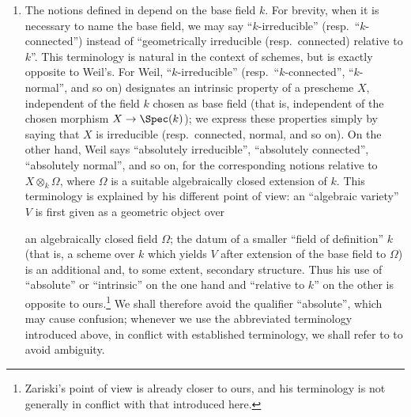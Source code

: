 \begin{remarks}[4.5.12]
\label{IV.4.5.12}
\begin{enumerate}
\item[\rm(i)]
\label{IV.4.5.12.i}
The notions defined in  depend on the base field $k$.
For brevity, when it is necessary to name the base field, we may say
``$k$-irreducible'' (resp.\ ``$k$-connected'') instead of
``geometrically irreducible (resp.\ connected) relative to $k$''.
This terminology is natural in the context of schemes, but is exactly
opposite to Weil's.
For Weil, ``$k$-irreducible'' (resp.\ ``$k$-connected'',
``$k$-normal'', and so on) designates an intrinsic property of a
prescheme $X$, independent of the field $k$ chosen as base field
(that is, independent of the chosen morphism
$X\to\Spec(k)$); we express these properties simply by saying that
$X$ is irreducible (resp.\ connected, normal, and so on).
On the other hand, Weil says ``absolutely irreducible'',
``absolutely connected'', ``absolutely normal'', and so on, for the
corresponding notions relative to $X\otimes_k\Omega$, where $\Omega$
is a suitable algebraically closed extension of $k$.
This terminology is explained by his different point of view:
an ``algebraic variety'' $V$ is first given as a geometric object over


an algebraically closed field $\Omega$; the datum of a smaller
``field of definition'' $k$ (that is, a scheme over $k$ which yields
$V$ after extension of the base field to $\Omega$) is an additional
and, to some extent, secondary structure.
Thus his use of ``absolute'' or ``intrinsic'' on the one hand and
``relative to $k$'' on the other is opposite to ours.\footnote{Zariski's
point of view is already closer to ours, and his terminology is not
generally in conflict with that introduced here.}
We shall therefore avoid the qualifier ``absolute'', which may cause
confusion; whenever we use the abbreviated terminology introduced
above, in conflict with established terminology, we shall refer to
 to avoid ambiguity.


\end{enumerate}
\end{remarks}
